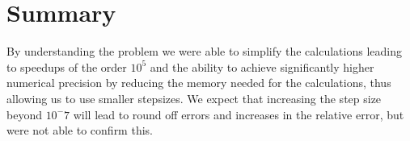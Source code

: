 \section*{Summary}

By understanding the problem we were able to simplify the
calculations leading to speedups of the order $10^5$ and the ability to achieve
significantly higher numerical precision by reducing the memory
needed for the calculations, thus allowing us to use smaller stepsizes.
We expect that increasing the step size beyond $10^-7$ will lead to round off
errors and increases in the relative error, but were not able to confirm this.
